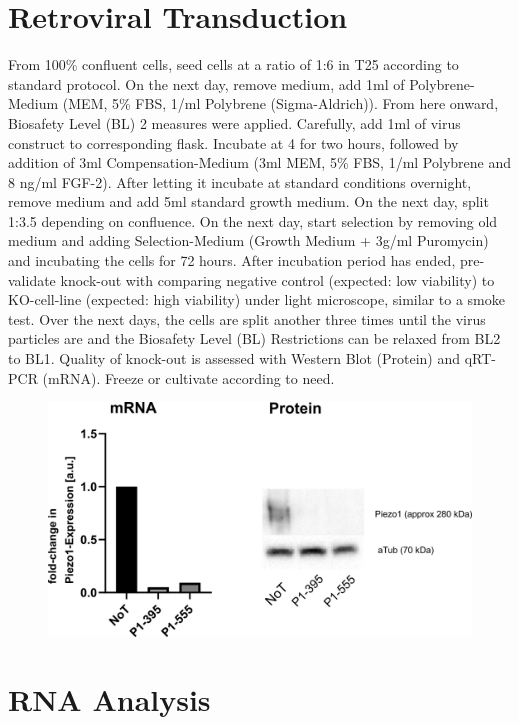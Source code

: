 \section{Retroviral Transduction}
From 100\% confluent cells, seed cells at a ratio of 1:6 in T25 according to standard protocol. On the next day, remove medium, add 1ml of Polybrene-Medium (MEM\textalpha{}, 5\% FBS, 1\mul{}/ml Polybrene (Sigma-Aldrich)). From here onward, Biosafety Level (BL) 2 measures were applied. Carefully, add 1ml of virus construct to corresponding flask. Incubate at 4 \degC for two hours, followed by addition of 3ml Compensation-Medium (3ml MEM\textalpha{}, 5\% FBS, 1\mul{}/ml Polybrene and 8 ng/ml FGF-2). After letting it incubate at standard conditions overnight, remove medium and add 5ml standard growth medium. On the next day, split 1:3.5 depending on confluence. On the next day, start selection by removing old medium and adding Selection-Medium (Growth Medium + 3\textmu{}g/ml Puromycin) and incubating the cells for 72 hours. After incubation period has ended, pre-validate knock-out with comparing negative control (expected: low viability) to KO-cell-line (expected: high viability) under light microscope, similar to a smoke test. Over the next days, the cells are split another three times until the virus particles are  and the Biosafety Level (BL) Restrictions can be relaxed from BL2 to BL1. Quality of knock-out is assessed with Western Blot (Protein) and qRT-PCR (mRNA). Freeze or cultivate according to need. 

\begin{figure}
    \centering
    \includegraphics[width=\linewidth]{Piezo1KO_Verification_WBandPCR.png}
    \caption{}
    \label{fig:KO-Verification}
\end{figure}

\section{RNA Analysis}
